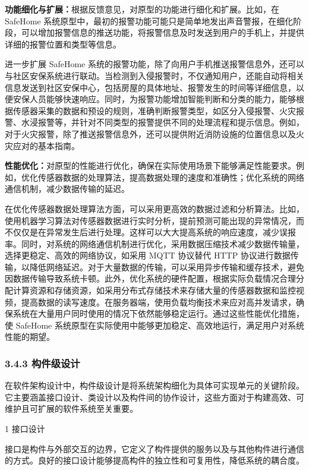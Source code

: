 \textbf{功能细化与扩展：}根据反馈意见，对原型的功能进行细化和扩展。比如，在 SafeHome 系统原型中，最初的报警功能可能只是简单地发出声音警报，在细化阶段，可以增加报警信息的推送功能，将报警信息及时发送到用户的手机上，并提供详细的报警位置和类型等信息。

进一步扩展 SafeHome 系统的报警功能，除了向用户手机推送报警信息外，还可以与社区安保系统进行联动。当检测到入侵报警时，不仅通知用户，还能自动将相关信息发送到社区安保中心，包括房屋的具体地址、报警发生的时间等详细信息，以便安保人员能够快速响应。同时，为报警功能增加智能判断和分类的能力，能够根据传感器采集的数据和预设的规则，准确判断报警类型，如区分入侵报警、火灾报警、水浸报警等，并针对不同类型的报警提供不同的处理流程和提示信息。例如，对于火灾报警，除了推送报警信息外，还可以提供附近消防设施的位置信息以及火灾应对的基本指南。

\textbf{性能优化：}对原型的性能进行优化，确保在实际使用场景下能够满足性能要求。例如，优化传感器数据的处理算法，提高数据处理的速度和准确性；优化系统的网络通信机制，减少数据传输的延迟。

在优化传感器数据处理算法方面，可以采用更高效的数据过滤和分析算法。比如，使用机器学习算法对传感器数据进行实时分析，提前预测可能出现的异常情况，而不仅仅是在异常发生后进行处理。这样可以大大提高系统的响应速度，减少误报率。同时，对系统的网络通信机制进行优化，采用数据压缩技术减少数据传输量，选择更稳定、高效的网络协议，如采用 MQTT 协议替代 HTTP 协议进行数据传输，以降低网络延迟。对于大量数据的传输，可以采用异步传输和缓存技术，避免因数据传输导致系统卡顿。此外，优化系统的硬件配置，根据实际负载情况合理分配计算资源和存储资源，如采用分布式存储技术来存储大量的传感器数据和监控视频，提高数据的读写速度。在服务器端，使用负载均衡技术来应对高并发请求，确保系统在大量用户同时使用的情况下依然能够稳定运行。通过这些性能优化措施，使 SafeHome 系统原型在实际使用中能够更加稳定、高效地运行，满足用户对系统性能的期望。

\subsubsection{3.4.3 构件级设计}\label{ux6784ux4ef6ux7ea7ux8bbeux8ba1}

在软件架构设计中，构件级设计是将系统架构细化为具体可实现单元的关键阶段。它主要涵盖接口设计、类设计以及构件间的协作设计，这些方面对于构建高效、可维护且可扩展的软件系统至关重要。

1 接口设计

接口是构件与外部交互的边界，它定义了构件提供的服务以及与其他构件进行通信的方式。良好的接口设计能够提高构件的独立性和可复用性，降低系统的耦合度。

